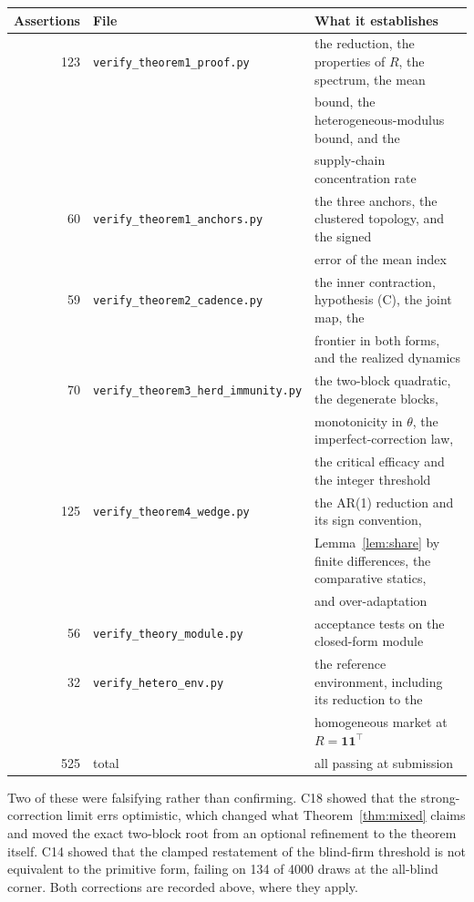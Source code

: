 \begin{center}
\footnotesize
\begin{tabular}{rll}
\toprule
Assertions & File & What it establishes \\
\midrule
123 & \texttt{verify\_theorem1\_proof.py} & the reduction, the properties of $R$, the spectrum, the mean \\
 & & bound, the heterogeneous-modulus bound, and the \\
 & & supply-chain concentration rate \\
60 & \texttt{verify\_theorem1\_anchors.py} & the three anchors, the clustered topology, and the signed \\
 & & error of the mean index \\
59 & \texttt{verify\_theorem2\_cadence.py} & the inner contraction, hypothesis (C), the joint map, the \\
 & & frontier in both forms, and the realized dynamics \\
70 & \texttt{verify\_theorem3\_herd\_immunity.py} & the two-block quadratic, the degenerate blocks, \\
 & & monotonicity in $\theta$, the imperfect-correction law, \\
 & & the critical efficacy and the integer threshold \\
125 & \texttt{verify\_theorem4\_wedge.py} & the AR(1) reduction and its sign convention, \\
 & & Lemma~\ref{lem:share} by finite differences, the comparative statics, \\
 & & and over-adaptation \\
56 & \texttt{verify\_theory\_module.py} & acceptance tests on the closed-form module \\
32 & \texttt{verify\_hetero\_env.py} & the reference environment, including its reduction to the \\
 & & homogeneous market at $R=\mathbf{1}\mathbf{1}^{\top}$ \\
\midrule
525 & total & all passing at submission \\
\bottomrule
\end{tabular}
\end{center}

Two of these were falsifying rather than confirming. C18 showed that the strong-correction limit errs optimistic, which changed what Theorem~\ref{thm:mixed} claims and moved the exact two-block root from an optional refinement to the theorem itself. C14 showed that the clamped restatement of the blind-firm threshold is not equivalent to the primitive form, failing on 134 of 4000 draws at the all-blind corner. Both corrections are recorded above, where they apply.


